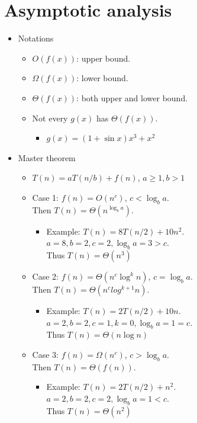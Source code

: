 \documentclass[twocolumn]{article}
\begin{document}
\section{Asymptotic analysis}
\begin{itemize}
\item Notations
  \begin{itemize}
  \item $O(f(x))$: upper bound.
  \item $\Omega(f(x))$: lower bound.
  \item $\Theta(f(x))$: both upper and lower bound.
  \item Not every $g(x)$ has $\Theta(f(x))$.
    \begin{itemize}
    \item $g(x) = (1 + \sin x) x^3 + x^2$
    \end{itemize}
  \end{itemize}
\item Master theorem
  \begin{itemize}
  \item $T(n) = a T(n/b) + f(n)$, $a \ge 1, b > 1$
  \item Case 1: $f(n) = O(n^c)$, $c < \log_b a$.\\
  Then $T(n) = \Theta(n^{\log_b a})$.
    \begin{itemize}
    \item Example: $T(n) = 8 T(n/2) + 10 n^2$.\\
    $a = 8, b = 2, c=2, \log_b a = 3 > c$.\\
    Thus $T(n) = \Theta(n^3)$
    \end{itemize}
  \item Case 2: $f(n) = \Theta(n^c \log^k n)$, $c=\log_b a$.\\
  Then $T(n) = \Theta(n^c log^{k+1} n)$.
    \begin{itemize}
    \item Example: $T(n) = 2 T(n/2) + 10 n$.\\
    $a=2, b=2, c=1, k=0, \log_b a = 1 = c$.\\
    Thus $T(n) = \Theta(n \log n)$
    \end{itemize}
  \item Case 3: $f(n) = \Omega(n^c)$, $c > \log_b a$.\\
  Then $T(n) = \Theta(f(n))$.
    \begin{itemize}
    \item Example: $T(n) = 2 T(n/2) + n^2$.\\
    $a=2, b=2, c=2, \log_b a = 1 < c$.\\
    Thus $T(n) = \Theta(n^2)$
    \end{itemize}
  \end{itemize}
\end{itemize}
\end{document}
